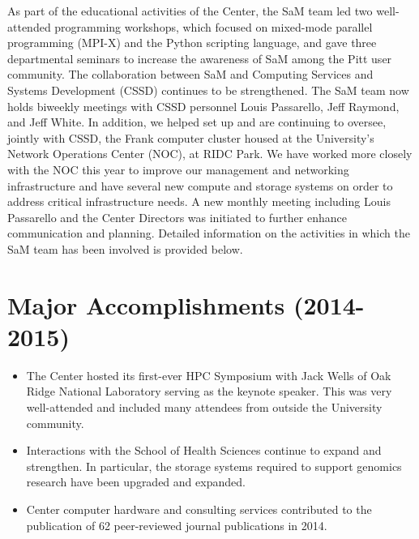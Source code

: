 As part of the educational activities of the Center, the SaM team led two well-attended programming workshops, which focused on mixed-mode parallel programming (MPI-X) and the Python scripting language, and
gave three departmental seminars to increase the awareness of SaM among the
Pitt user community.  The collaboration between SaM and Computing Services and
Systems Development (CSSD) continues to be strengthened. The SaM team now holds
biweekly meetings with CSSD personnel Louis Passarello, Jeff Raymond, and Jeff
White.  In addition, we helped set up and are continuing to oversee, jointly
with CSSD, the Frank computer cluster housed at the University's Network
Operations Center (NOC), at RIDC Park.  We have worked more closely with the NOC
this year to improve our management and networking infrastructure and have
several new compute and storage systems on order to address critical infrastructure needs.  A new
monthly meeting including Louis Passarello and the Center Directors was
initiated to further enhance communication and planning.  Detailed information
on the activities in which the SaM team has been involved is provided below.


\section{Major Accomplishments (2014-2015)}

\begin{itemize}
    \item The Center hosted its first-ever HPC Symposium with Jack Wells of
          Oak Ridge National Laboratory serving as the keynote speaker.  This
          was very well-attended and included many attendees from outside the
          University community.

    \item Interactions with the School of Health Sciences continue to expand
	  and strengthen.  In particular, the storage systems required to
	  support genomics research have been upgraded and expanded.

    \item Center computer hardware and consulting services contributed to the
	  publication of 62 peer-reviewed journal publications in 2014.

\end{itemize}

